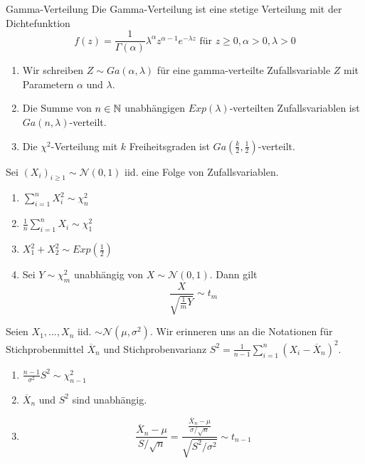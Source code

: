 \begin{subbox}{Gamma-Verteilung}
	Die Gamma-Verteilung ist eine stetige Verteilung mit der Dichtefunktion
	\[f(z) = \frac{1}{\Gamma(\alpha)}\lambda^{\alpha}z^{\alpha-1}e^{-\lambda z} \text{ für } z \geq 0, \alpha >0, \lambda > 0\]
	\begin{enumerate}
		\item Wir schreiben $Z \sim Ga(\alpha, \lambda)$ für eine gamma-verteilte Zufallsvariable $Z$ mit Parametern $\alpha$ und $\lambda$.
		\item Die Summe von $n \in \mathbb{N}$ unabhängigen $Exp(\lambda)$-verteilten Zufallsvariablen ist $Ga(n, \lambda)$-verteilt.
		\item Die $\chi^2$-Verteilung mit $k$ Freiheitsgraden ist $Ga\left(\frac{k}{2}, \frac{1}{2}\right)$-verteilt. 
	\end{enumerate}
\end{subbox}
Sei $(X_i)_{i \geq 1} \sim \mathcal{N}(0,1)$ iid. eine Folge von Zufallsvariablen. 
\begin{enumerate}
	\item $\sum_{i = 1}^{n} X_i^2 \sim \chi^2_n$
	\item $\frac{1}{n}\sum_{i = 1}^n X_i \sim \chi_1^2$
	\item $X_1^2 + X_2^2 \sim Exp\left(\frac{1}{2}\right)$
	\item Sei $Y \sim \chi_m^2$ unabhängig von $X \sim \mathcal{N}(0,1)$. Dann gilt \[\frac{X}{\sqrt{\frac{1}{m}Y}} \sim t_m\] 
\end{enumerate}
Seien $X_1, \ldots, X_n$ iid. $\sim \mathcal{N}(\mu, \sigma^2)$.
Wir erinneren uns an die Notationen für Stichprobenmittel $\overline{X}_n$ und Stichprobenvarianz $S^2 = \frac{1}{n-1}\sum_{i = 1}^n(X_i - \overline{X}_n)^2$.
\begin{enumerate}
	\item $\frac{n-1}{\sigma^2}S^2 \sim \chi_{n-1}^2$
	\item $\overline{X}_n$ und $S^2$ sind unabhängig.
	\item \[\frac{\overline{X}_n - \mu}{S/\sqrt{n}} = \frac{\frac{\overline{X}_n - \mu}{\sigma / \sqrt{n}}}{\sqrt{S^2/\sigma^2}} \sim t_{n-1}\]
\end{enumerate}

